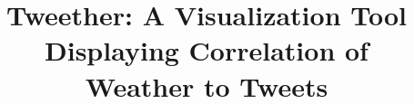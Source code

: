 \documentclass[journal]{vgtc}                %
\title{Tweether: A Visualization Tool Displaying Correlation of \\Weather to Tweets}
\author{}
\begin{document}





%


%





\nocite{*}

\end{document}
